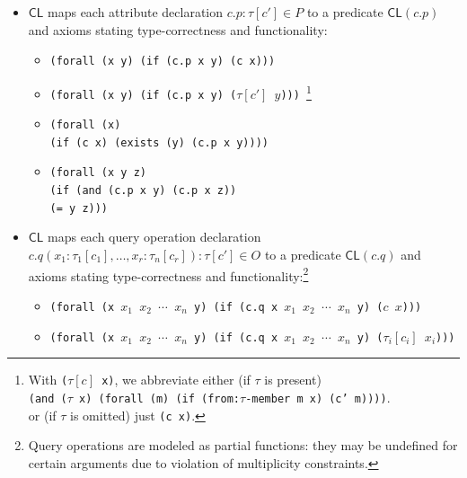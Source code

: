 \documentclass[10pt,fleqn,%
\ifpretendfinal
final%
\else
draft%
\fi,
]{scrreprt}
\newcommand*{\CL}{\ensuremath{\mathsf{CL}}\xspace}
\newcommand{\white}[1]{{\color{white}{#1}}}
\newcommand{\qqquad}{\white{x}\qquad}
\begin{document}
\begin{itemize}
  \item $\CL$ maps each attribute declaration $c.p : \tau[c'] \in P$ to a predicate $\CL(c.p)$ and axioms stating type-correctness
and functionality:
\begin{itemize}
\item
\texttt{(forall (x y) (if (c.p x y) (c x))) }
\item 
\texttt{(forall (x y) (if (c.p x y) ($\tau[c']$ $y$))) }\footnote
{With \texttt{($\tau[c]$ x)}, we abbreviate either (if $\tau$ is present)\\
\texttt{(and ($\tau$ x) (forall (m) (if (from:$\tau$-member m x) (c' m))))}.\\
or (if $\tau$ is omitted) just \texttt{(c x)}.}
\item 
\texttt{(forall (x)\\
\qqquad  (if (c x) (exists (y) (c.p x y))))}
\item 
\texttt{(forall (x y z)}\\
\qqquad \texttt{(if (and (c.p x y) (c.p x z))}\\
\qqquad\qqquad\texttt{(= y z)))}
\end{itemize}
  \item $\CL$ maps each query operation declaration $c.q(x_1 :
    \tau_1[c_1], \dots, x_r : \tau_n[c_r]) : \tau[c'] \in O$ to a
    predicate $\CL(c.q)$ and axioms stating type-correctness and
    functionality:\footnote{Query operations are modeled as partial
functions: they may be undefined for certain arguments due to
violation of multiplicity constraints.}
\begin{itemize}
\item
\texttt{(forall (x $x_1$ $x_2$ $\cdots$  $x_n$ y) (if (c.q x $x_1$ $x_2$ $\cdots$  $x_n$ y) ($c$ $x$))) }
\item 
\texttt{(forall (x $x_1$ $x_2$ $\cdots$  $x_n$ y) (if (c.q x $x_1$ $x_2$ $\cdots$  $x_n$ y) ($\tau_i[c_i]$ $x_i$))) }

\end{itemize}
\end{itemize}
\end{document}
